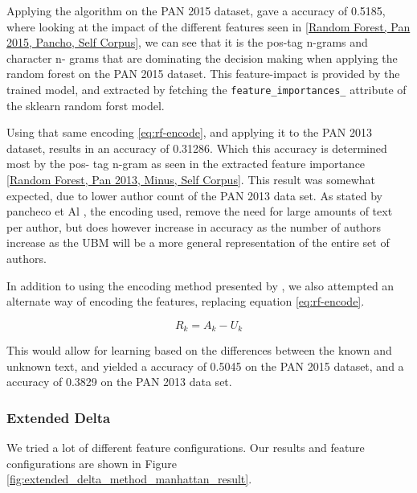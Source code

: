 Applying the algorithm on the PAN 2015 dataset, gave a accuracy of 0.5185,
where looking at the impact of the different features seen in \ref{Random Forest, Pan 
2015, Pancho, Self Corpus}, we can see that it is the pos-tag n-grams and character n-
grams that are dominating the decision making when applying the random forest on the 
PAN 2015 dataset. This feature-impact is provided by the trained model, and extracted 
by fetching the \texttt{feature\_importances\_} attribute of the sklearn random forst 
model.


Using that same encoding \ref{eq:rf-encode}, and applying it to the PAN 2013 dataset, 
results in an accuracy of 0.31286. Which this accuracy is determined most by the pos-
tag n-gram as seen in the extracted feature importance \ref{Random Forest, Pan 2013, 
Minus, Self Corpus}. This result was somewhat expected, due to lower author count of 
the PAN 2013 data set. As stated by pancheco et Al \cite{pacheco2015}, the encoding 
used, remove the need for large amounts of text per author, but does however increase 
in accuracy as the number of authors increase as the \gls{UBM} will be a more general 
representation of the entire set of authors. 



In addition to using the encoding method presented by \cite{pacheco2015}, we
also attempted an alternate way of encoding the features, replacing equation
\ref{eq:rf-encode}.

$$
R_k = A_k - U_k
$$

This would allow for learning based on the differences between the known and unknown 
text, and yielded a accuracy of 0.5045 on the PAN 2015 dataset, and a accuracy of 
0.3829 on the PAN 2013 data set.


\subsubsection{Extended Delta}
We tried a lot of different feature configurations. Our results and feature
configurations are shown in Figure \ref{fig:extended_delta_method_manhattan_result}.

